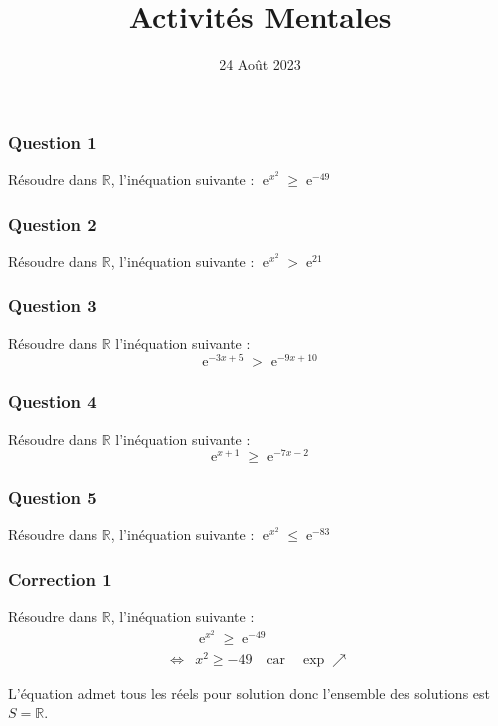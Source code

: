 \documentclass[15pt, mathserif]{beamer}
\title{Activités Mentales}
\date{24 Août 2023}
\DeclareMathOperator{\e}{e}
\newcommand{\R}{\mathbb{R}}			%
\begin{document}
\begin{frame}
    \titlepage
\end{frame}

\begin{frame} 
	\frametitle{Question 1}
 Résoudre dans $\R$, l'inéquation suivante : $\e^{x^2} \geqslant \e^{-49}$\end{frame}


\begin{frame} 
	\frametitle{Question 2}
 Résoudre dans $\R$, l'inéquation suivante : $\e^{x^2}>\e^{21}$\end{frame}


\begin{frame} 
	\frametitle{Question 3}
Résoudre dans $\R$ l'inéquation suivante : 
 \[ \e^{-3x+5} > \e^{-9x+10}\] 
 \end{frame}


\begin{frame} 
	\frametitle{Question 4}
Résoudre dans $\R$ l'inéquation suivante : 
 \[ \e^{x+1} \geqslant \e^{-7x-2}\] 
 \end{frame}


\begin{frame} 
	\frametitle{Question 5}
Résoudre dans $\R$, l'inéquation suivante : 
 $ \e^{x^2}\leqslant \e^{-83}$\end{frame}


\begin{frame}
\vspace{-10mm}
	\frametitle{Correction 1}
\begin{multicols}{2} 
 \bigskip 
 Résoudre dans $\R$, l'inéquation suivante : \begin{align*} & \e^{x^2} \geqslant \e^{-49} \\ 
 \Leftrightarrow &x^2\geqslant-49\quad \text{car} \quad \exp \nearrow 
 \end{align*} 
 
 \bigskip 
 
 L'équation admet tous les réels pour solution donc l'ensemble des solutions est $S=\R$.
 
 \end{multicols} 
 \end{frame}
\end{document}
